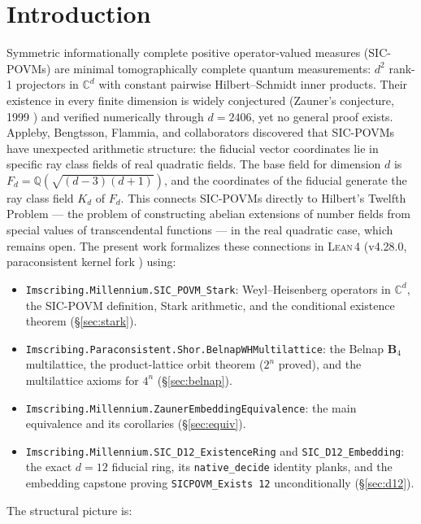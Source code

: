 \documentclass[12pt,a4paper]{article}
\newcommand{\BFour}{\mathbf{B}_4}
\newcommand{\Kd}{K_d}
\newcommand{\Lean}{\textsc{Lean\,4}}
\begin{document}
\section{Introduction}
\label{sec:intro}
Symmetric informationally complete positive operator-valued measures
(SIC-POVMs) are minimal tomographically complete quantum measurements: $d^2$
rank-1 projectors in $\mathbb{C}^d$ with constant pairwise Hilbert--Schmidt
inner products. Their existence in every finite dimension is widely
conjectured (Zauner's conjecture, 1999 \cite{Zauner1999}) and verified
numerically through $d = 2406$, yet no general proof exists.
Appleby, Bengtsson, Flammia, and collaborators \cite{Appleby2013,Appleby2017}
discovered that SIC-POVMs have unexpected arithmetic structure: the fiducial
vector coordinates lie in specific ray class fields of real quadratic fields.
The base field for dimension $d$ is $F_d = \mathbb{Q}(\sqrt{(d-3)(d+1)})$, and
the coordinates of the fiducial generate the ray class field $\Kd$ of $F_d$.
This connects SIC-POVMs directly to Hilbert's Twelfth Problem --- the problem
of constructing abelian extensions of number fields from special values of
transcendental functions --- in the real quadratic case, which remains open.
The present work formalizes these connections in \Lean{} \cite{Lean4}
(v4.28.0, paraconsistent kernel fork \cite{p4rakernel}) using:
\begin{itemize}
  \item \texttt{Imscribing.Millennium.SIC\_POVM\_Stark}: Weyl--Heisenberg
    operators in $\mathbb{C}^d$, the SIC-POVM definition, Stark arithmetic,
    and the conditional existence theorem (\S\ref{sec:stark}).
  \item \texttt{Imscribing.Paraconsistent.Shor.BelnapWHMultilattice}: the
    Belnap $\BFour$ multilattice, the product-lattice orbit theorem
    ($2^n$ proved), and the multilattice axioms for $4^n$ (\S\ref{sec:belnap}).
  \item \texttt{Imscribing.Millennium.ZaunerEmbeddingEquivalence}: the main
    equivalence and its corollaries (\S\ref{sec:equiv}).
  \item \texttt{Imscribing.Millennium.SIC\_D12\_ExistenceRing} and
    \texttt{SIC\_D12\_Embedding}: the exact $d = 12$ fiducial ring, its
    \texttt{native\_decide} identity planks, and the embedding capstone
    proving \texttt{SICPOVM\_Exists 12} unconditionally (\S\ref{sec:d12}).
\end{itemize}
The structural picture is:
\end{document}
